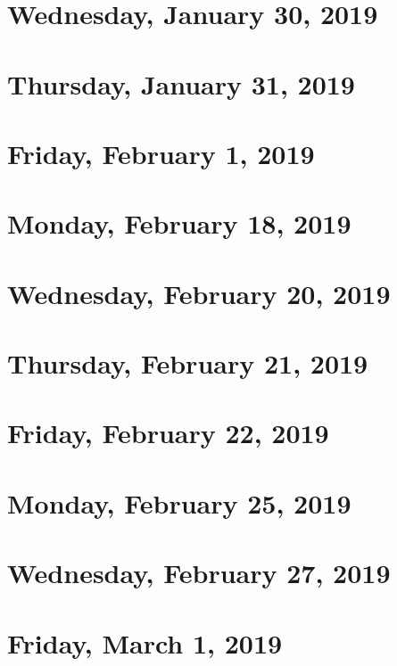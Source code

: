 \documentclass[reqno]{amsart}
\begin{document}
\section{Wednesday, January 30, 2019}
    

\section{Thursday, January 31, 2019}
    

\section{Friday, February 1, 2019}
    

\section{Monday, February 18, 2019}
    

\section{Wednesday, February 20, 2019}
    

\section{Thursday, February 21, 2019}
    

\section{Friday, February 22, 2019}
    

\section{Monday, February 25, 2019}
    

\section{Wednesday, February 27, 2019}
    
    
\section{Friday, March 1, 2019}
    
\end{document}
